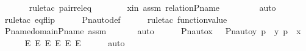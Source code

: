 \begin{isabellebody}
\ \ \ \ \ \isamarkupfalse%
\ {\isacharparenleft}{\kern0pt}rule{\isacharunderscore}{\kern0pt}tac\ pair{\isacharunderscore}{\kern0pt}rel{\isacharunderscore}{\kern0pt}eq{\isacharparenright}{\kern0pt}\ \isanewline
\ \ \ \ \ \isamarkupfalse%
\ xin\ assm\ relation{\isacharunderscore}{\kern0pt}P{\isacharunderscore}{\kern0pt}name\ \isanewline
\ \ \ \ \ \ \isamarkupfalse%
\ auto\isanewline
\ \ \ \ \isamarkupfalse%
\ {\isacharparenleft}{\kern0pt}rule{\isacharunderscore}{\kern0pt}tac\ eq{\isacharunderscore}{\kern0pt}flip{\isacharparenright}{\kern0pt}\isanewline
\ \ \ \ \isamarkupfalse%
\ Pn{\isacharunderscore}{\kern0pt}auto{\isacharunderscore}{\kern0pt}def\isanewline
\ \ \ \ \isamarkupfalse%
\ {\isacharparenleft}{\kern0pt}rule{\isacharunderscore}{\kern0pt}tac\ function{\isacharunderscore}{\kern0pt}value{\isacharparenright}{\kern0pt}\isanewline
\ \ \ \ \isamarkupfalse%
\ P{\isacharunderscore}{\kern0pt}name{\isacharunderscore}{\kern0pt}domain{\isacharunderscore}{\kern0pt}P{\isacharunderscore}{\kern0pt}name\ assm\ \isanewline
\ \ \ \ \isamarkupfalse%
\ auto\ \isanewline
\ \ \isamarkupfalse%
\ {\isachardoublequoteopen}\ Pn{\isacharunderscore}{\kern0pt}auto{\isacharparenleft}{\kern0pt}{\isasympi}{\isacharparenright}{\kern0pt}{\isacharbackquote}{\kern0pt}x\ {\isacharequal}{\kern0pt}\ {\isacharbraceleft}{\kern0pt}\ {\isacharless}{\kern0pt}Pn{\isacharunderscore}{\kern0pt}auto{\isacharparenleft}{\kern0pt}{\isasympi}{\isacharparenright}{\kern0pt}{\isacharbackquote}{\kern0pt}y{\isacharcomma}{\kern0pt}\ {\isasympi}{\isacharbackquote}{\kern0pt}p{\isachargreater}{\kern0pt}\ {\isachardot}{\kern0pt}\ {\isacharless}{\kern0pt}y{\isacharcomma}{\kern0pt}\ p{\isachargreater}{\kern0pt}\ {\isasymin}\ x{\isacharbraceright}{\kern0pt}{\isachardoublequoteclose}\ \isanewline
\ \ \ \ \isamarkupfalse%
\ E{}\ E{}\ E{}\ E{}\ E{}\ E{}\isanewline
\ \ \ \ \isamarkupfalse%
\ auto\isanewline
{}\isamarkupfalse%
%
\endisatagproof
{\isafoldproof}%
%
\isadelimproof
\ \isanewline
%
\endisadelimproof
\isanewline
{}\isamarkupfalse%
\isanewline
%
\isadelimtheory
%
\endisadelimtheory
%
\isatagtheory
{}\isamarkupfalse%
%
\endisatagtheory
{\isafoldtheory}%
%
\isadelimtheory
%
\endisadelimtheory
%
\end{isabellebody}%
\endinput
